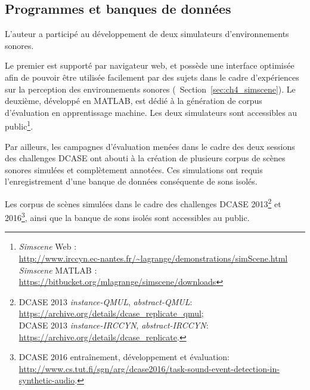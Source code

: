 \subsection{Programmes et banques de données}

L'auteur a participé au développement de deux simulateurs d'environnements sonores.

Le premier est supporté par navigateur web, et possède une interface optimisée afin de pouvoir être utilisée facilement par des sujets dans le cadre d'expériences sur la perception des environnements sonores (\cf~Section~\ref{sec:ch4_simscene}). Le deuxième, développé en MATLAB, est dédié à la génération de corpus d'évaluation en apprentissage machine. Les deux simulateurs sont accessibles au public\footnote{\emph{Simscene} Web : \\ \url{http://www.irccyn.ec-nantes.fr/~lagrange/demonstrations/simScene.html} \\ \emph{Simscene} MATLAB : \\ \url{https://bitbucket.org/mlagrange/simscene/downloads}}.

Par ailleurs, les campagnes d'évaluation menées dans le cadre des deux sessions des challenges DCASE ont abouti à la création de plusieurs corpus de scènes sonores simulées et complètement annotées. Ces simulations ont requis l'enregistrement d'une banque de données conséquente de sons isolés.

Les corpus de scènes simulées dans le cadre des challenges DCASE 2013\footnote{DCASE 2013 \emph{instance-QMUL}, \emph{abstract-QMUL}: \\ \url{https://archive.org/details/dcase_replicate_qmul}; \\ DCASE 2013 \emph{instance-IRCCYN}, \emph{abstract-IRCCYN}: \\ \url{https://archive.org/details/dcase_replicate}.} et 2016\footnote{DCASE 2016 entraînement, développement et évaluation: \\ \url{http://www.cs.tut.fi/sgn/arg/dcase2016/task-sound-event-detection-in-synthetic-audio}.}, ainsi que la banque de sons isolés sont accessibles au public.








